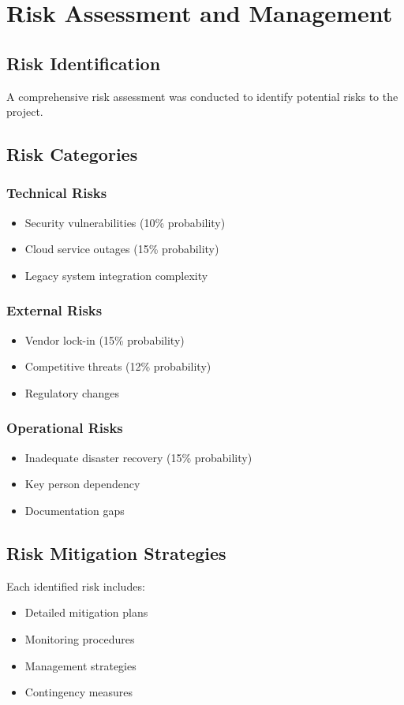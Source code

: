 \documentclass[12pt,a4paper]{report}
\begin{document}
\chapter{Risk Assessment and Management}

\section{Risk Identification}
A comprehensive risk assessment was conducted to identify potential risks to the project.

\section{Risk Categories}
\subsection{Technical Risks}
\begin{itemize}[leftmargin=*]
    \item Security vulnerabilities (10\% probability)
    \item Cloud service outages (15\% probability)
    \item Legacy system integration complexity
\end{itemize}

\subsection{External Risks}
\begin{itemize}[leftmargin=*]
    \item Vendor lock-in (15\% probability)
    \item Competitive threats (12\% probability)
    \item Regulatory changes
\end{itemize}

\subsection{Operational Risks}
\begin{itemize}[leftmargin=*]
    \item Inadequate disaster recovery (15\% probability)
    \item Key person dependency
    \item Documentation gaps
\end{itemize}

\section{Risk Mitigation Strategies}
Each identified risk includes:
\begin{itemize}[leftmargin=*]
    \item Detailed mitigation plans
    \item Monitoring procedures
    \item Management strategies
    \item Contingency measures
\end{itemize}
\end{document}
